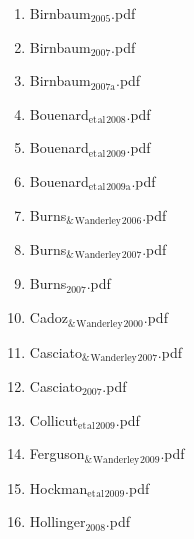 \documentclass[11pt]{article}
\begin{document}
\begin{enumerate}
\begin{enumerate}
\begin{enumerate}
\item Birnbaum$_{\text{2005}}$.pdf
\label{sec-1-1-1-1-15-7-2-3}

\item Birnbaum$_{\text{2007}}$.pdf
\label{sec-1-1-1-1-15-7-2-4}

\item Birnbaum$_{\text{2007a}}$.pdf
\label{sec-1-1-1-1-15-7-2-5}

\item Bouenard$_{\text{et}}$$_{\text{al}}$$_{\text{2008}}$.pdf
\label{sec-1-1-1-1-15-7-2-6}

\item Bouenard$_{\text{et}}$$_{\text{al}}$$_{\text{2009}}$.pdf
\label{sec-1-1-1-1-15-7-2-7}

\item Bouenard$_{\text{et}}$$_{\text{al}}$$_{\text{2009a}}$.pdf
\label{sec-1-1-1-1-15-7-2-8}

\item Burns$_{\text{\&}}$$_{\text{Wanderley}}$$_{\text{2006}}$.pdf
\label{sec-1-1-1-1-15-7-2-9}

\item Burns$_{\text{\&}}$$_{\text{Wanderley}}$$_{\text{2007}}$.pdf
\label{sec-1-1-1-1-15-7-2-10}

\item Burns$_{\text{2007}}$.pdf
\label{sec-1-1-1-1-15-7-2-11}

\item Cadoz$_{\text{\&}}$$_{\text{Wanderley}}$$_{\text{2000}}$.pdf
\label{sec-1-1-1-1-15-7-2-12}

\item Casciato$_{\text{\&}}$$_{\text{Wanderley}}$$_{\text{2007}}$.pdf
\label{sec-1-1-1-1-15-7-2-13}

\item Casciato$_{\text{2007}}$.pdf
\label{sec-1-1-1-1-15-7-2-14}

\item Collicut$_{\text{et}}$$_{\text{al}}$$_{\text{2009}}$.pdf
\label{sec-1-1-1-1-15-7-2-15}

\item Ferguson$_{\text{\&}}$$_{\text{Wanderley}}$$_{\text{2009}}$.pdf
\label{sec-1-1-1-1-15-7-2-16}

\item Hockman$_{\text{et}}$$_{\text{al}}$$_{\text{2009}}$.pdf
\label{sec-1-1-1-1-15-7-2-17}

\item Hollinger$_{\text{2008}}$.pdf
\label{sec-1-1-1-1-15-7-2-18}


\end{enumerate}
\end{enumerate}
\end{enumerate}
\end{document}
